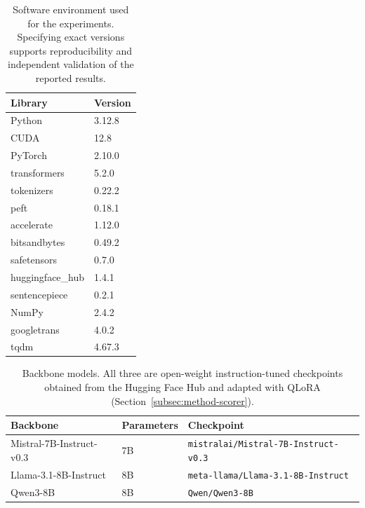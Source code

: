 \begin{table}[htbp]
\centering\small
\begin{tabular}{@{}ll@{}}
\toprule
Library & Version \\
\midrule
Python            & 3.12.8  \\
CUDA              & 12.8    \\
PyTorch           & 2.10.0  \\
transformers      & 5.2.0   \\
tokenizers        & 0.22.2  \\
peft              & 0.18.1  \\
accelerate        & 1.12.0  \\
bitsandbytes      & 0.49.2  \\
safetensors       & 0.7.0   \\
huggingface\_hub  & 1.4.1   \\
sentencepiece     & 0.2.1   \\
NumPy             & 2.4.2   \\
googletrans       & 4.0.2   \\
tqdm              & 4.67.3  \\
\bottomrule
\end{tabular}
\caption{Software environment used for the experiments. Specifying exact versions supports
reproducibility and independent validation of the reported results.}
\label{tab:technical}

\end{table}

\begin{table}[htbp]
\centering\small
\begin{tabular}{@{}lll@{}}
\toprule
Backbone & Parameters & Checkpoint \\
\midrule
Mistral-7B-Instruct-v0.3 & 7B & \texttt{mistralai/Mistral-7B-Instruct-v0.3} \\
Llama-3.1-8B-Instruct    & 8B & \texttt{meta-llama/Llama-3.1-8B-Instruct}   \\
Qwen3-8B                 & 8B & \texttt{Qwen/Qwen3-8B}                      \\
\bottomrule
\end{tabular}
\caption{Backbone models. All three are open-weight instruction-tuned checkpoints obtained from the
Hugging Face Hub and adapted with QLoRA (Section~\ref{subsec:method-scorer}).}
\label{tab:backbones}

\end{table}

\clearpage
